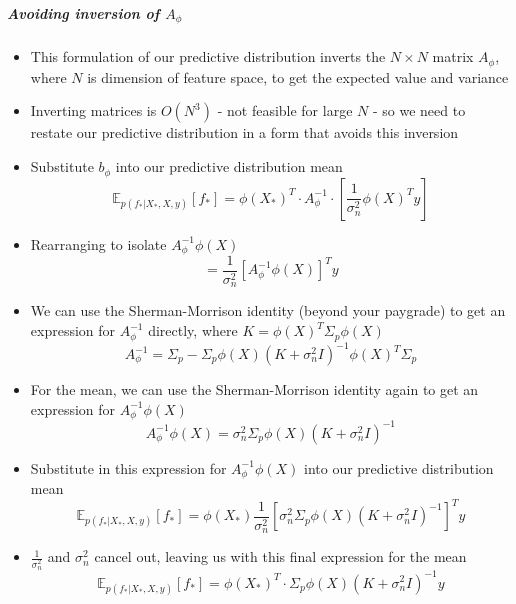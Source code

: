 \documentclass[12pt]{article}
\begin{document}
\subparagraph{Avoiding inversion of $A_{\phi}$}
\begin{itemize}
    \item This formulation of our predictive distribution inverts the $N \times N$ matrix $A_{\phi}$, where $N$ is dimension of feature space, to get the expected value and variance
    \item Inverting matrices is $O(N^3)$ - not feasible for large $N$ - so we need to restate our predictive distribution in a form that avoids this inversion
    \item Substitute $b_{\phi}$ into our predictive distribution mean
\begin{equation}
    \mathbb{E}_{p(f_*|X_*,X,y)}[f_*] = \phi(X_*)^T \cdot A_\phi^{-1} \cdot \left[\frac{1}{\sigma_n^2}\phi(X)^Ty\right]
\end{equation}
    \item Rearranging to isolate $A_\phi^{-1}\phi(X)$
\begin{equation}
    = \frac{1}{\sigma_n^2}\left[A_{\phi}^{-1}\phi(X)\right]^Ty
\end{equation}
    \item We can use the Sherman-Morrison identity (beyond your paygrade) to get an expression for $A_{\phi}^{-1}$ directly, where $K =\phi(X)^T\Sigma_p\phi(X)$
\begin{equation}
    A_{\phi}^{-1} = \Sigma_p - \Sigma_p\phi(X)(K+\sigma_n^2I)^{-1}\phi(X)^T\Sigma_p
\end{equation}
    \item For the mean, we can use the Sherman-Morrison identity again to get an expression for $A_{\phi}^{-1}\phi(X)$
\begin{equation}
    A_{\phi}^{-1}\phi(X) = \sigma_n^2\Sigma_p\phi(X)(K+\sigma_n^2I)^{-1}
\end{equation}
    \item Substitute in this expression for $A_{\phi}^{-1}\phi(X)$ into our predictive distribution mean
\begin{equation}
    \mathbb{E}_{p(f_*|X_*,X,y)}[f_*] = \phi(X_*) \frac{1}{\sigma_n^2}\left[\sigma_n^2\Sigma_p\phi(X)(K+\sigma_n^2I)^{-1}\right]^Ty
\end{equation}
    \item $\frac{1}{\sigma_n^2}$ and $\sigma_n^2$ cancel out, leaving us with this final expression for the mean
\begin{equation}
    \mathbb{E}_{p(f_*|X_*,X,y)}[f_*] = \phi(X_*)^T \cdot \Sigma_p\phi(X)(K+\sigma_n^2I)^{-1}y
\end{equation}

\end{itemize}
\end{document}
